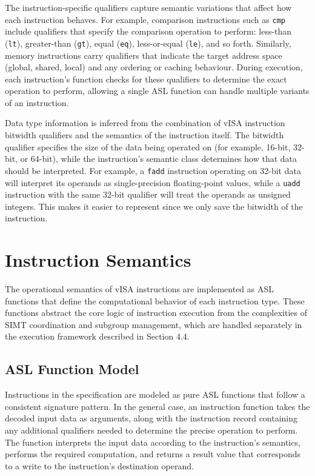 The instruction-specific qualifiers capture semantic variations that affect how
each instruction behaves. For example, comparison instructions such as
\lstinline{cmp} include qualifiers that specify the comparison operation to
perform: less-than (\lstinline{lt}), greater-than (\lstinline{gt}), equal
(\lstinline{eq}), less-or-equal (\lstinline{le}), and so forth. Similarly,
memory instructions carry qualifiers that indicate the target address space
(global, shared, local) and any ordering or caching behaviour. During
execution, each instruction's function checks for these qualifiers to determine
the exact operation to perform, allowing a single ASL function can handle
multiple variants of an instruction.

Data type information is inferred from the combination of vISA instruction
bitwidth qualifiers and the semantics of the instruction itself. The bitwidth
qualifier specifies the size of the data being operated on (for example,
16-bit, 32-bit, or 64-bit), while the instruction's semantic class determines
how that data should be interpreted. For example, a \lstinline{fadd}
instruction operating on 32-bit data will interpret its operands as
single-precision floating-point values, while a \lstinline{uadd} instruction
with the same 32-bit qualifier will treat the operands as unsigned integers.
This makes it easier to represent since we only save the bitwidth of the
instruction.

\section{Instruction Semantics}

The operational semantics of vISA instructions are implemented as ASL functions
that define the computational behavior of each instruction type. These
functions abstract the core logic of instruction execution from the
complexities of SIMT coordination and subgroup management, which are handled
separately in the execution framework described in Section 4.4.

\subsection{ASL Function Model}

Instructions in the specification are modeled as pure ASL functions that follow
a consistent signature pattern. In the general case, an instruction function
takes the decoded input data as arguments, along with the instruction record
containing any additional qualifiers needed to determine the precise operation
to perform. The function interprets the input data according to the
instruction's semantics, performs the required computation, and returns a
result value that corresponds to a write to the instruction's destination
operand.

